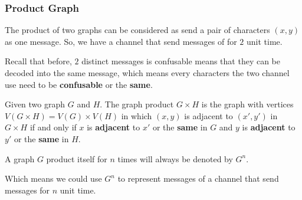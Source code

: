 \begin{frame}
      \frametitle{Product Graph}
      
      The product of two graphs can be considered as send a pair of characters $(x,y)$ as one message. So, we have a channel that send messages of for $2$ unit time.

      \pause
      \smallskip

      Recall that before, $2$ distinct messages is confusable means that they can be decoded into the same message, which means every characters the two channel use need to be \textbf{confusable} or the \textbf{same}.

      \begin{definition}\label{def:graphProduct}
            Given two graph $ G $ and $ H $. The graph product $ G \times H $ is the graph with vertices $ V(G \times H) = V(G) \times V(H) $ in which $ (x,y) $ is adjacent to $ (x',y') $ in $ G \times H $ if and only if $ x $ is \textbf{adjacent} to $ x' $ or the \textbf{same} in $ G $ and $ y $ is \textbf{adjacent} to $ y' $ or the \textbf{same} in $ H $.

            \pause

            A graph $ G $ product itself for $ n $ times will always be denoted by $ G^n $.

            Which means we could use $ G^n $ to represent messages of a channel that send messages for $n$ unit time.
      \end{definition}
\end{frame}

